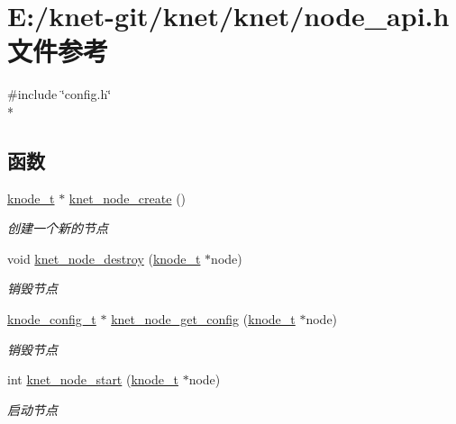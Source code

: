\hypertarget{a00103}{}\section{E\+:/knet-\/git/knet/knet/node\+\_\+api.h 文件参考}
\label{a00103}
{\ttfamily \#include \char`\"{}config.\+h\char`\"{}}\\*
\subsection*{函数}
\begin{DoxyCompactItemize}
\item 
\hyperlink{a00066_a5e720b27efbc9ad744240f5f4233763a_a5e720b27efbc9ad744240f5f4233763a}{knode\+\_\+t} $\ast$ \hyperlink{a00135_ga178be792592fd4557bfe931b5845b66a_ga178be792592fd4557bfe931b5845b66a}{knet\+\_\+node\+\_\+create} ()
\begin{DoxyCompactList}\small\item\em 创建一个新的节点 \end{DoxyCompactList}\item 
void \hyperlink{a00135_ga7b577b6a8883b8c69cfc2d9eadb98d03_ga7b577b6a8883b8c69cfc2d9eadb98d03}{knet\+\_\+node\+\_\+destroy} (\hyperlink{a00066_a5e720b27efbc9ad744240f5f4233763a_a5e720b27efbc9ad744240f5f4233763a}{knode\+\_\+t} $\ast$node)
\begin{DoxyCompactList}\small\item\em 销毁节点 \end{DoxyCompactList}\item 
\hyperlink{a00066_af1cfaee0eb1c76ebf06076b95cc47ee1_af1cfaee0eb1c76ebf06076b95cc47ee1}{knode\+\_\+config\+\_\+t} $\ast$ \hyperlink{a00135_ga2ceebf25bbc4306817d7ef45ca1c44b8_ga2ceebf25bbc4306817d7ef45ca1c44b8}{knet\+\_\+node\+\_\+get\+\_\+config} (\hyperlink{a00066_a5e720b27efbc9ad744240f5f4233763a_a5e720b27efbc9ad744240f5f4233763a}{knode\+\_\+t} $\ast$node)
\begin{DoxyCompactList}\small\item\em 销毁节点 \end{DoxyCompactList}\item 
int \hyperlink{a00135_gac3884a7a111f4fff8aad997d41e92712_gac3884a7a111f4fff8aad997d41e92712}{knet\+\_\+node\+\_\+start} (\hyperlink{a00066_a5e720b27efbc9ad744240f5f4233763a_a5e720b27efbc9ad744240f5f4233763a}{knode\+\_\+t} $\ast$node)
\begin{DoxyCompactList}\small\item\em 启动节点 \end{DoxyCompactList}\item 

\end{DoxyCompactItemize}
